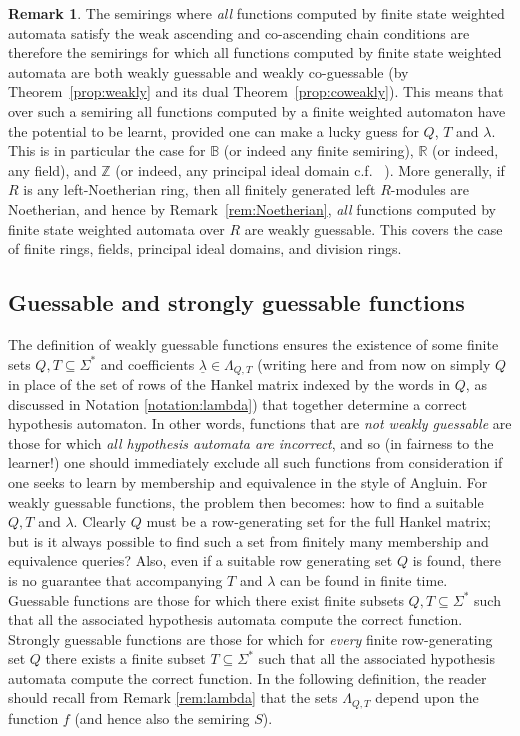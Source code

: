 \documentclass[10pt,a4paper]{amsart}
\theoremstyle{definition}
\newtheorem{rem}[thm]{Remark}
\numberwithin{equation}{section}
\numberwithin{theorem}{section}
\begin{document}
\begin{rem}
\label{rem:fields2}
The semirings where \emph{all} functions computed by finite state weighted automata satisfy the weak ascending and co-ascending chain conditions are therefore the semirings for which all functions computed by finite state weighted automata are both weakly guessable and weakly co-guessable (by Theorem~\ref{prop:weakly} and its dual Theorem~\ref{prop:coweakly}). This means that over such a semiring all functions computed by a finite weighted automaton  have the potential to be learnt, provided one can make a lucky guess for $Q$, $T$ and $\lambda$. This is in particular the case for $\mathbb{B}$ (or indeed any finite semiring), $\mathbb{R}$ (or indeed, any field), and $\mathbb{Z}$  (or indeed, any principal ideal domain c.f. ~\cite{HKRS20}). More generally, if $R$ is any left-Noetherian ring, then all finitely generated left $R$-modules are Noetherian, and hence by Remark~\ref{rem:Noetherian}, \emph{all} functions computed by finite state weighted automata over $R$ are weakly guessable. This covers the case of finite rings, fields, principal ideal domains, and division rings.
\end{rem}

\subsection{Guessable and strongly guessable functions}

The definition of weakly guessable functions ensures the existence of some finite sets $Q,T \subseteq \Sigma^*$ and coefficients $\underline{\lambda} \in \Lambda_{Q,T}$ (writing here and from now on simply $Q$ in place of the set of rows of the Hankel matrix indexed by the words in $Q$, as discussed in Notation \ref{notation:lambda}) that together determine a correct hypothesis automaton. In other words, functions that are \emph{not weakly guessable} are those for which \emph{all hypothesis automata are incorrect}, and so (in fairness to the learner!) one should immediately exclude all such functions from consideration if one seeks to learn by membership and equivalence in the style of Angluin. For weakly guessable functions, the problem then becomes: how to find a suitable $Q, T$ and $\lambda$. Clearly $Q$ must be a row-generating set for the full Hankel matrix; but is it always possible to find such a set from finitely many membership and equivalence queries? Also, even if a suitable row generating set $Q$ is found, there is no guarantee that accompanying $T$ and $\lambda$ can be found in finite time. Guessable functions are those for which there exist finite subsets $Q, T \subseteq \Sigma^*$ such that all the associated hypothesis automata compute the correct function. Strongly guessable functions are those for which for \emph{every} finite row-generating set $Q$ there exists a finite subset $T \subseteq \Sigma^*$ such that all the associated hypothesis automata compute the correct function. In the following definition, the reader should recall from Remark \ref{rem:lambda} that the sets $\Lambda_{Q, T}$ depend upon the function $f$ (and hence also the semiring $S$).
\end{document}
